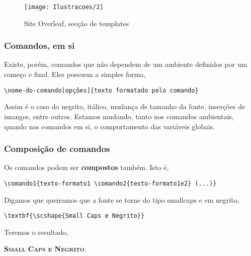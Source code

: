 \documentclass[12pt, brazilian, a5paper]{abntex2} %
\newlength\mystoreparindent
\newenvironment{myparindent}[1]{%
  \setlength{\mystoreparindent}{\the\parindent}
  \setlength{\parindent}{#1}
}{%
  \setlength{\parindent}{\mystoreparindent}
}
\begin{document}
\begin{figure}[!htb]
  \caption{\label{Exemplo1}\small{Site Overleaf, secção de templates}}

  \begin{center}
    \texttt{[image: Ilustracoes/2]}
  \end{center}

\end{figure}

\subsubsection{Comandos, em si}
\begin{myparindent}{0pt}
  \noindent Existe, porém, comandos que não dependem de um ambiente
  definidos por um começo e final. Eles possuem a simples forma,

  \begin{center}
\begin{verbatim}
\nome-do-comando[opções]{texto formatado pelo comando}
\end{verbatim}
  \end{center}
  \noident Assim é o caso do negrito, itálico, mudança de tamanho da
  fonte, inserções de imanges, entre outros. Estamos mudando, tanto nos comandos
  ambientais, quando nos comandos em si, o comportamento das variáveis
  globais.
  \vspace{0.4cm}

  \subsubsection{Composição de comandos}
  Os comandos podem ser \textbf{compostos} também. Isto é,
  \begin{center}
\begin{verbatim}
\comando1{texto-formato1 \comando2{texto-formato1e2} (...)}
\end{verbatim}
  \end{center}

  Digamos que queiramos que a fonte se torne do tipo smallcaps e em
  negrito,
\begin{verbatim}
\textbf{\scshape{Small Caps e Negrito}}
\end{verbatim}

  Teremos o resultado,

  \vspace{0.3cm}

  \textbf{\scshape{Small Caps e Negrito}}.


\end{myparindent}
\end{document}
